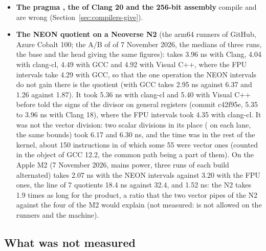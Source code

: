 \begin{itemize}
denormalized results to zero) are states of the same kind that GAOL does not
clear on the FPU intervals of these processors; a path for them would have
to.
\item[$\bullet$] \textbf{The pragma , the
 of Clang 20 and the 256-bit
 assembly} compile and are wrong
(Section~\ref{sec:compilers-give}).
\item[$\bullet$] \textbf{The NEON quotient on a Neoverse N2} (the arm64
runners of GitHub, Azure Cobalt 100; the A/B of  of
7 November 2026, the medians of three runs, the base and the head giving the
same figures):  takes
3.96 ns with Clang, 4.04 with clang-cl, 4.49 with GCC and 4.92 with Visual
C++, where the FPU intervals take 4.29 with GCC, so that the one operation
the NEON intervals do not gain there is the quotient (with GCC 
takes 2.95 ns against 6.37 and  1.26 against 1.87). It took 5.36
ns with clang-cl and 5.40 with Visual C++ before 
told the signs of the divisor on general registers (commit c42f95e, 5.35 to
3.96 ns with Clang 18), where the FPU intervals took 4.35 with clang-cl. It
was not the vector division: two scalar divisions in its place
( on each lane, the same bounds) took 6.17 and 6.30 ns, and
the time was in the rest of the kernel, about 150 instructions in
 of which some 55 were vector ones (counted in the
object of GCC 12.2, the common path being a part of them). On the Apple M2
(7 November 2026, mains power, three runs of each build alternated)
 takes 2.07 ns with the NEON intervals against 3.20 with the FPU
ones, the line of 7 quotients 18.4 ns against 32.4, and 
1.52 ns: the N2 takes 1.9 times as long for the product, a ratio that the
two vector pipes of the N2 against the four of the M2 would explain (not
measured:  is not allowed on the runners and the machine).
\end{itemize}

\subsection{What was not measured}

